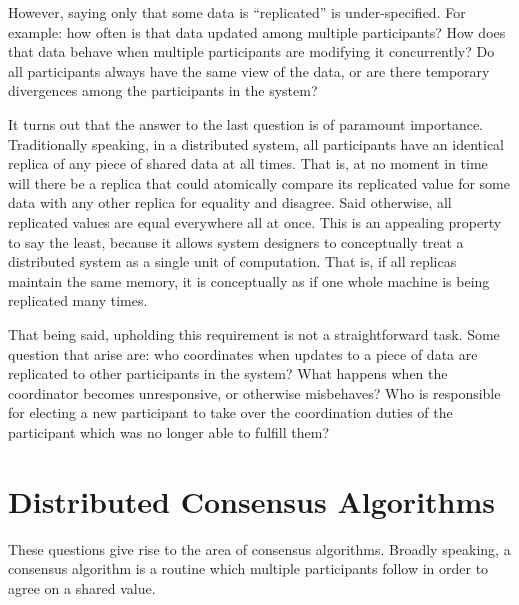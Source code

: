 However, saying only that some data is ``replicated'' is under-specified. For
example: how often is that data updated among multiple participants? How does
that data behave when multiple participants are modifying it concurrently? Do
all participants always have the same view of the data, or are there temporary
divergences among the participants in the system?

It turns out that the answer to the last question is of paramount importance.
Traditionally speaking, in a distributed system, all participants have an
identical replica of any piece of shared data at all times. That is, at no
moment in time will there be a replica that could atomically compare its
replicated value for some data with any other replica for equality and disagree.
Said otherwise, all replicated values are equal everywhere all at once. This is
an appealing property to say the least, because it allows system designers to
conceptually treat a distributed system as a single unit of computation. That
is, if all replicas maintain the same memory, it is conceptually as if one whole
machine is being replicated many times.

That being said, upholding this requirement is not a straightforward task. Some
question that arise are: who coordinates when updates to a piece of data are
replicated to other participants in the system? What happens when the
coordinator becomes unresponsive, or otherwise misbehaves? Who is responsible
for electing a new participant to take over the coordination duties of the
participant which was no longer able to fulfill them?

\section{Distributed Consensus Algorithms}
\label{sec:dca-safety}

These questions give rise to the area of consensus algorithms. Broadly speaking,
a consensus algorithm is a routine which multiple participants follow in order
to agree on a shared value.

